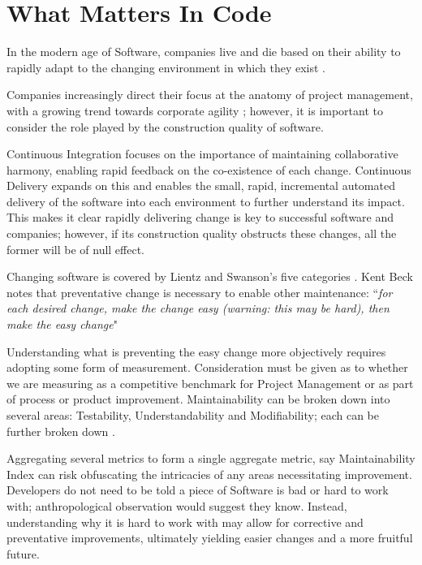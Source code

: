\section{What Matters In Code}

In the modern age of Software, companies live and die based on their ability to rapidly adapt to the changing environment in which they exist \parencite[Chapter~1]{kersten_2018}.

Companies increasingly direct their focus at the anatomy of project management, with a growing trend towards corporate agility \parencite{stateOfAgile_2019}; however, it is important to consider the role played by the construction quality of software.

Continuous Integration \parencite{duvall2007continuous} focuses on the importance of maintaining collaborative harmony, enabling rapid feedback on the co-existence of each change. Continuous Delivery \parencite{humble_farley_2010} expands on this and enables the small, rapid, incremental automated delivery of the software into each environment to further understand its impact. This makes it clear rapidly delivering change is key to successful software and companies; however, if its construction quality obstructs these changes, all the former will be of null effect.

Changing software is covered by Lientz and Swanson's five categories \parencite*{lientz1980software}. Kent Beck notes that preventative change is necessary to enable other maintenance: ``\textit{for each desired change, make the change easy (warning: this may be hard), then make the easy change}" \parencite{beck_2012_easychange}

Understanding what is preventing the easy change more objectively requires adopting some form of measurement. Consideration must be given as to whether we are measuring as a competitive benchmark for Project Management or as part of process or product improvement. Maintainability can be broken down into several areas: Testability, Understandability and Modifiability; each can be further broken down \parencite{Boehm:1976:QES:800253.807736}.

Aggregating several metrics to form a single aggregate metric, say Maintainability Index \parencite{bray1997c4} can risk obfuscating the intricacies of any areas necessitating improvement. Developers do not need to be told a piece of Software is bad or hard to work with; anthropological observation would suggest they know. Instead, understanding why it is hard to work with may allow for corrective and preventative improvements, ultimately yielding easier changes and a more fruitful future.


